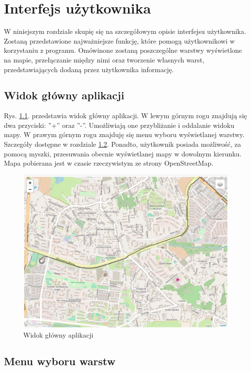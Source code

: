 \chapter{Interfejs użytkownika}
\label{cha:UI}
W niniejszym rozdziale skupię się na szczegółowym opisie interfejsu użytkownika. Zostaną przedstawione najważniejsze funkcję, które pomogą użytkownikowi w korzystaniu z programu. Omówinone zostaną poszczególne warstwy wyświetlone na mapie, przełączanie między nimi oraz tworzenie własnych warst, przedstawiających dodaną przez użytkownika informację.
\newpage
\section{Widok główny aplikacji}
\label{sec:mainView}

Rys. \ref{mainView}. przedstawia widok główny aplikacji. W lewym górnym rogu znajdują się dwa przyciski: ''+'' oraz ''-''. Umożliwiają one przybliżanie i oddalanie widoku mapy. W prawym górnym rogu znajduję się menu wyboru wyświetlanej warstwy. Szczegóły dostępne w rozdziale \ref{sec:layerMenu}. Ponadto, użytkownik posiada możliwość, za pomocą myszki, przesuwania obecnie wyświetlanej mapy w dowolnym kierunku. Mapa pobierana jest w czasie rzeczywistym ze strony OpenStreetMap.

\begin{figure}[h]
\caption{Widok główny aplikacji}
\label{mainView}
\centering
\includegraphics[width=1.1\textwidth]{mainScreen}
\end{figure}

\newpage

\section{Menu wyboru warstw}
\label{sec:layerMenu}

